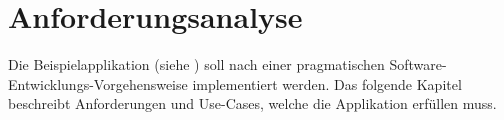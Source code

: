 \chapter{Anforderungsanalyse}

Die Beispielapplikation (siehe ) soll nach einer pragmatischen Software-Entwicklungs-Vorgehensweise implementiert werden.
Das folgende Kapitel beschreibt Anforderungen und Use-Cases, welche die Applikation erfüllen muss.\\





